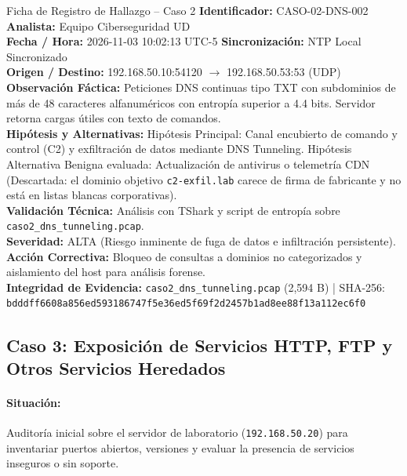 \documentclass[11pt,letterpaper]{article}
\begin{document}
\begin{hallazgobox}{Ficha de Registro de Hallazgo -- Caso 2}
    \textbf{Identificador:} CASO-02-DNS-002 \hfill \textbf{Analista:} Equipo Ciberseguridad UD\\
    \textbf{Fecha / Hora:} 2026-11-03 10:02:13 UTC-5 \hfill \textbf{Sincronización:} NTP Local Sincronizado\\
    \textbf{Origen / Destino:} 192.168.50.10:54120 $\rightarrow$ 192.168.50.53:53 (UDP)\\
    \textbf{Observación Fáctica:} Peticiones DNS continuas tipo TXT con subdominios de más de 48 caracteres alfanuméricos con entropía superior a 4.4 bits. Servidor retorna cargas útiles con texto de comandos.\\
    \textbf{Hipótesis y Alternativas:} Hipótesis Principal: Canal encubierto de comando y control (C2) y exfiltración de datos mediante DNS Tunneling. Hipótesis Alternativa Benigna evaluada: Actualización de antivirus o telemetría CDN (Descartada: el dominio objetivo \texttt{c2-exfil.lab} carece de firma de fabricante y no está en listas blancas corporativas).\\
    \textbf{Validación Técnica:} Análisis con TShark y script de entropía sobre \texttt{caso2\_dns\_tunneling.pcap}.\\
    \textbf{Severidad:} ALTA (Riesgo inminente de fuga de datos e infiltración persistente).\\
    \textbf{Acción Correctiva:} Bloqueo de consultas a dominios no categorizados y aislamiento del host para análisis forense.\\
    \textbf{Integridad de Evidencia:} \texttt{caso2\_dns\_tunneling.pcap} (2,594 B) | SHA-256: \texttt{bdddff6608a856ed593186747f5e36ed5f69f2d2457b1ad8ee88f13a112ec6f0}
\end{hallazgobox}

\newpage
\subsection{Caso 3: Exposición de Servicios HTTP, FTP y Otros Servicios Heredados}

\paragraph{Situación:} Auditoría inicial sobre el servidor de laboratorio (\texttt{192.168.50.20}) para inventariar puertos abiertos, versiones y evaluar la presencia de servicios inseguros o sin soporte.
\end{document}
